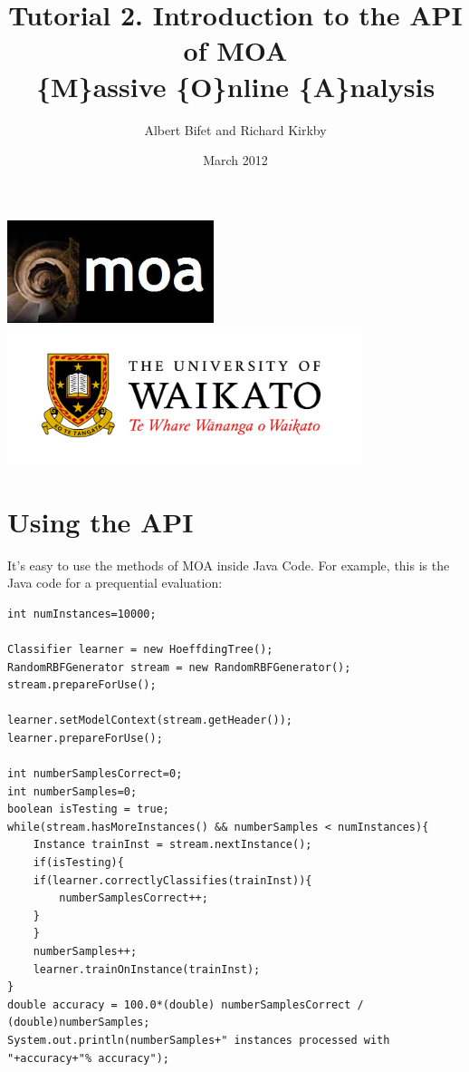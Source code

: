\documentclass[a4paper,12pt]{article}
\title{Tutorial 2. Introduction to the API of MOA \\ \{M\}assive \{O\}nline \{A\}nalysis}
\author{Albert Bifet and Richard Kirkby}
\date{March 2012}
\begin{document}
\lstset{language=Java,basicstyle=\tiny,numbers=left}
\maketitle
\begin{center}
\includegraphics[height=3cm]{images/LogoMOA.jpg} \\
\includegraphics[height=4cm]{images/Waikato.jpg} \\ 
\end{center}
\thispagestyle{empty}
\newpage
\setcounter{page}{1}


\section{Using the API}

It's easy to use the methods of MOA inside Java Code. For example, this is the Java code for a prequential evaluation:

\begin{lstlisting}[caption={Java Code Example},label=lst:fullclassifier]
int numInstances=10000;

Classifier learner = new HoeffdingTree();
RandomRBFGenerator stream = new RandomRBFGenerator();
stream.prepareForUse();

learner.setModelContext(stream.getHeader());
learner.prepareForUse();

int numberSamplesCorrect=0;
int numberSamples=0;
boolean isTesting = true;
while(stream.hasMoreInstances() && numberSamples < numInstances){
    Instance trainInst = stream.nextInstance();
    if(isTesting){
	if(learner.correctlyClassifies(trainInst)){
	    numberSamplesCorrect++;
	}
    }
    numberSamples++;
    learner.trainOnInstance(trainInst);
}
double accuracy = 100.0*(double) numberSamplesCorrect / (double)numberSamples;
System.out.println(numberSamples+" instances processed with "+accuracy+"% accuracy");
\end{lstlisting}
\end{document}
